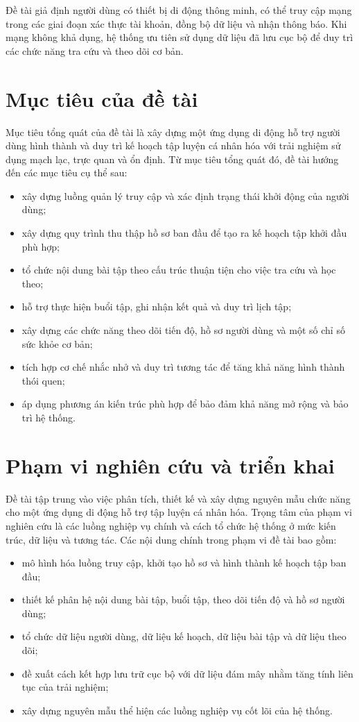 Đề tài giả định người dùng có thiết bị di động thông minh, có thể truy cập mạng trong các giai đoạn xác thực tài khoản, đồng bộ dữ liệu và nhận thông báo. Khi mạng không khả dụng, hệ thống ưu tiên sử dụng dữ liệu đã lưu cục bộ để duy trì các chức năng tra cứu và theo dõi cơ bản.

\section{Mục tiêu của đề tài}

Mục tiêu tổng quát của đề tài là xây dựng một ứng dụng di động hỗ trợ người dùng hình thành và duy trì kế hoạch tập luyện cá nhân hóa với trải nghiệm sử dụng mạch lạc, trực quan và ổn định. Từ mục tiêu tổng quát đó, đề tài hướng đến các mục tiêu cụ thể sau:

\begin{itemize}
    \item xây dựng luồng quản lý truy cập và xác định trạng thái khởi động của người dùng;
    \item xây dựng quy trình thu thập hồ sơ ban đầu để tạo ra kế hoạch tập khởi đầu phù hợp;
    \item tổ chức nội dung bài tập theo cấu trúc thuận tiện cho việc tra cứu và học theo;
    \item hỗ trợ thực hiện buổi tập, ghi nhận kết quả và duy trì lịch tập;
    \item xây dựng các chức năng theo dõi tiến độ, hồ sơ người dùng và một số chỉ số sức khỏe cơ bản;
    \item tích hợp cơ chế nhắc nhở và duy trì tương tác để tăng khả năng hình thành thói quen;
    \item áp dụng phương án kiến trúc phù hợp để bảo đảm khả năng mở rộng và bảo trì hệ thống.
\end{itemize}

\section{Phạm vi nghiên cứu và triển khai}

Đề tài tập trung vào việc phân tích, thiết kế và xây dựng nguyên mẫu chức năng cho một ứng dụng di động hỗ trợ tập luyện cá nhân hóa. Trọng tâm của phạm vi nghiên cứu là các luồng nghiệp vụ chính và cách tổ chức hệ thống ở mức kiến trúc, dữ liệu và tương tác. Các nội dung chính trong phạm vi đề tài bao gồm:

\begin{itemize}
    \item mô hình hóa luồng truy cập, khởi tạo hồ sơ và hình thành kế hoạch tập ban đầu;
    \item thiết kế phân hệ nội dung bài tập, buổi tập, theo dõi tiến độ và hồ sơ người dùng;
    \item tổ chức dữ liệu người dùng, dữ liệu kế hoạch, dữ liệu bài tập và dữ liệu theo dõi;
    \item đề xuất cách kết hợp lưu trữ cục bộ với dữ liệu đám mây nhằm tăng tính liên tục của trải nghiệm;
    \item xây dựng nguyên mẫu thể hiện các luồng nghiệp vụ cốt lõi của hệ thống.
\end{itemize}

